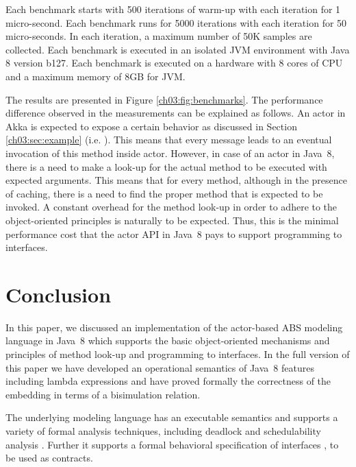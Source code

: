Each benchmark starts with 500 iterations of warm-up with each iteration for 1 micro-second.
Each benchmark runs for 5000 iterations with each iteration for 50 micro-seconds.
In each iteration, a maximum number of 50K samples are collected.
Each benchmark is executed in an isolated JVM environment with Java 8 version b127.
Each benchmark is executed on a hardware with 8 cores of CPU and a maximum memory of 8GB for JVM.

The results are presented in Figure \ref{ch03:fig:benchmarks}.
The performance difference observed in the measurements can be explained as follows.
An actor in Akka is expected to expose a certain behavior as discussed in Section \ref{ch03:sec:example} (i.e. ).
This means that every message leads to an eventual invocation of this method inside actor.
However, in case of an actor in Java~8, there is a need to make a look-up for the actual method to be executed with expected arguments. 
This means that for every method, although in the presence of caching, there is a need to find the proper method that is expected to be invoked. 
A constant overhead for the method look-up  in order to adhere to the object-oriented principles is naturally to be expected.
Thus, this is the minimal performance cost that the actor API in Java~8 pays to support  programming to interfaces.

\section{Conclusion}
\label{ch03:sec:conclusion}

In this paper, we discussed an implementation of the actor-based ABS modeling language
in Java~8 which supports  the basic object-oriented mechanisms
and principles of method look-up and programming to interfaces.
In the full version of this paper we have developed an operational semantics of Java~8 features including lambda expressions 
and have proved formally the correctness of the embedding in terms of a bisimulation relation.

The underlying modeling language has an executable semantics
and supports a variety of formal analysis techniques, including
deadlock and schedulability analysis \cite{GiachinoGLLW13,JaghooriBCS09}.
Further it supports a formal 
behavioral specification of interfaces \cite{hahnlehjlssw11}, to be used as contracts.




